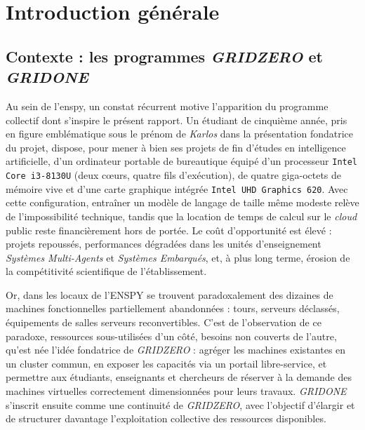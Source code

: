 \chapter*{Introduction générale}

\section*{Contexte : les programmes \emph{GRIDZERO} et \emph{GRIDONE}}

Au sein de l'\acrshort{enspy}, un constat récurrent motive l'apparition du programme collectif dont s'inspire le présent rapport. Un étudiant de cinquième année, pris en figure emblématique sous le prénom de \emph{Karlos} dans la présentation fondatrice du projet, dispose, pour mener à bien ses projets de fin d'études en intelligence artificielle, d'un ordinateur portable de bureautique équipé d'un processeur \texttt{Intel Core~i3-8130U} (deux cœurs, quatre fils d'exécution), de quatre giga-octets de mémoire vive et d'une carte graphique intégrée \texttt{Intel UHD Graphics~620}. Avec cette configuration, entraîner un modèle de langage de taille même modeste relève de l'impossibilité technique, tandis que la location de temps de calcul sur le \emph{cloud} public reste financièrement hors de portée. Le coût d'opportunité est élevé : projets repoussés, performances dégradées dans les unités d'enseignement \emph{Systèmes Multi-Agents} et \emph{Systèmes Embarqués}, et, à plus long terme, érosion de la compétitivité scientifique de l'établissement.

Or, dans les locaux de l'ENSPY se trouvent paradoxalement des dizaines de machines fonctionnelles partiellement abandonnées : tours, serveurs déclassés, équipements de salles serveurs reconvertibles. C'est de l'observation de ce paradoxe, ressources sous-utilisées d'un côté, besoins non couverts de l'autre, qu'est née l'idée fondatrice de \emph{GRIDZERO} : agréger les machines existantes en un cluster commun, en exposer les capacités via un portail libre-service, et permettre aux étudiants, enseignants et chercheurs de réserver à la demande des machines virtuelles correctement dimensionnées pour leurs travaux. \emph{GRIDONE} s'inscrit ensuite comme une continuité de \emph{GRIDZERO}, avec l'objectif d'élargir et de structurer davantage l'exploitation collective des ressources disponibles.

